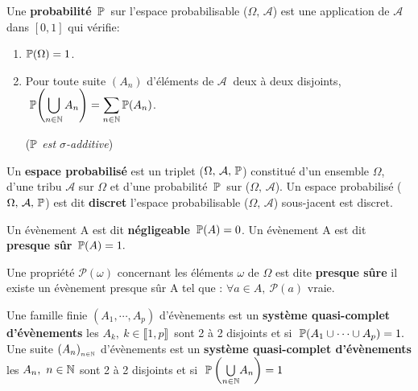 \noindent Une \textbf{probabilité} \(\,\mathbb{P}\,\) sur l'espace probabilisable (\(\Omega,\,\mathcal{A}\)) est une application de \(\mathcal{A}\) dans \([0,1]\) qui vérifie:\vspace{0.1cm}
\begin{enumerate}[leftmargin=1.5cm]
    \item \(\mathbb{P}(\Omega)=1\).\vspace{-0.2cm}
    
    \item Pour toute suite \((A_n)\) d'éléments de \(\mathcal{A}\ \) deux à deux disjoints, \(\; \displaystyle \mathbb{P}\!\left(\bigcup_{n\in \mathbb{N}}A_n\right)=\sum_{n\in \mathbb{N}}\mathbb{P}(A_n)\).\vspace{-0.3cm}\\
    \begin{small}
        (\emph{$\mathbb{P}$ est $\sigma$-additive})
    \end{small}
\end{enumerate}

\vspace{1.4cm}

Un \textbf{espace probabilisé} est un triplet (\(\Omega,\,\mathcal{A},\,\mathbb{P}\)) constitué d'un ensemble \(\Omega\), d'une tribu \(\mathcal{A}\) sur \(\Omega\) et d'une probabilité \(\,\mathbb{P}\,\) sur (\(\Omega,\,\mathcal{A}\)). Un espace probabilisé (\(\Omega,\,\mathcal{A},\,\mathbb{P}\)) est dit \textbf{discret} \ssi l'espace probabilisable (\(\Omega,\,\mathcal{A}\)) sous-jacent est discret.

\vspace{1.2cm}

Un évènement A est dit \textbf{négligeable} \ssi \(\, \mathbb{P}(A)=0\).\!\! Un évènement A est dit \textbf{presque sûr} \ssi \(\, \mathbb{P}(A)=1.\)

\vspace{1cm}

Une propriété \(\mathscr{P}(\omega)\) concernant les éléments \(\omega\) de \(\Omega\) est dite \textbf{presque sûre} \ssi il existe un évènement presque sûr A tel que : \(\forall a\in A,\ \mathscr{P}(a)\) vraie.

\vspace{1.3cm}

\noindent Une famille finie \((A_1,\cdots,A_p)\) d'évènements est un \textbf{système quasi-complet d'évènements} \ssi les \(A_k,\ k\in \llbracket 1,p \rrbracket\,\) sont 2 à 2 disjoints et si \(\;\mathbb{P}(A_1\cup\cdots\cup A_p)=1.\)\vspace{0.4cm}\\
Une suite \((A_n)_{_{n\in \mathbb{N}}}\) d'évènements est un \textbf{système quasi-complet d'évènements} \ssi les \(A_n,\ n\in \mathbb{N}\) sont 2 à 2 disjoints et si \(\;\mathbb{P}\left(\underset{n\in \mathbb{N}}{\bigcup}A_n\right)=1\)

